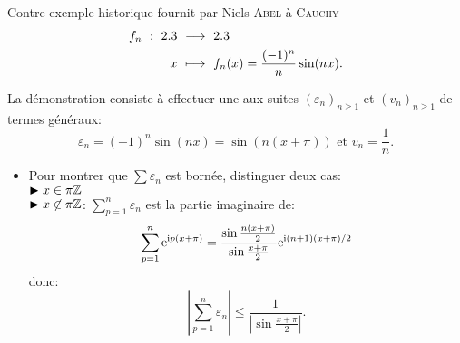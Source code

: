 \begin{box_titre}{Contre-exemple historique fournit par Niels \textsc{Abel} à \textsc{Cauchy}}
    \begin{alignat*}{2}
        f_n\ :\ 2.3\ &\longrightarrow\ 2.3\\
        x\ &\longmapsto\ f_n(x) = \frac{(-1)^n}{n}\sin(nx).
    \end{alignat*}
\end{box_titre}

\begin{preuve}
    La démonstration consiste à effectuer une  aux suites $(\varepsilon_n)_{n\geqslant1}$ et $(v_n)_{n\geqslant1}$ de termes généraux:
    $$\varepsilon_n = (-1)^n \sin(nx) = \sin(n(x + \pi)) \text{ et } v_n = \frac{1}{n}.$$
    \begin{itemize}
        \item Pour montrer que $\sum \varepsilon_n$ est bornée, distinguer deux cas:\\
        $\blacktriangleright x \in \pi \mathbb{Z}$\\
        $\blacktriangleright x \not \in \pi \mathbb{Z}$:
        $\sum\limits_{p=1}^{n} \varepsilon_n$ est la partie imaginaire de:\\
        $$\sum_{p=1}^{n} \mathrm{e}^{\mathrm{i} p(x+\pi)} = \frac{\sin\frac{n(x+\pi)}{2}}{\sin\frac{x+\pi}{2}}\mathrm{e}^{\mathrm{i} (n+1)(x+\pi)/2}$$
        donc:
        $$\left| \sum_{p=1}^{n} \varepsilon_n \right| \leqslant \frac{1}{\left|\sin\frac{x+\pi}{2} \right|}.$$
    \end{itemize}
\end{preuve}
